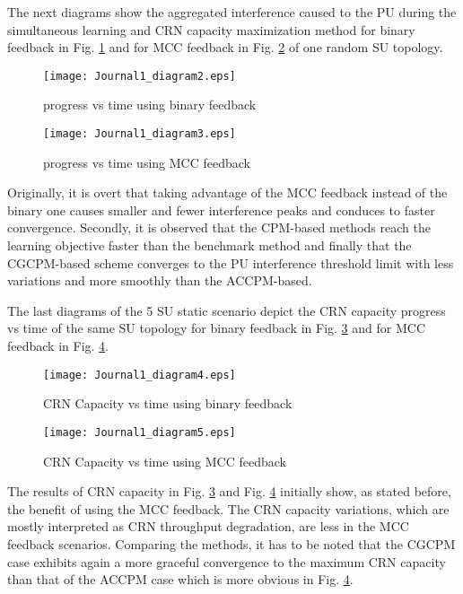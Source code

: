 \documentclass[journal]{IEEEtran}
\begin{document}
The next diagrams show the aggregated interference caused to the PU during the simultaneous learning and CRN capacity maximization method for binary feedback in Fig. \ref{fig4} and for MCC feedback in Fig. \ref{fig5} of one random SU topology.
\begin{figure}[!h]
\centering
\texttt{[image: Journal1\_diagram2.eps]}
\caption{ progress vs time using binary feedback}
\label{fig4}
\end{figure}
\begin{figure}[!h]
\centering
\texttt{[image: Journal1\_diagram3.eps]}
\caption{ progress vs time using MCC feedback}
\label{fig5}
\end{figure}
Originally, it is overt that taking advantage of the MCC feedback instead of the binary one causes smaller and fewer interference peaks and conduces to faster convergence. Secondly, it is observed that the CPM-based methods reach the learning objective faster than the benchmark method and finally that the CGCPM-based scheme converges to the PU interference threshold limit with less variations and more smoothly than the ACCPM-based.

The last diagrams of the 5 SU static scenario depict the CRN capacity progress vs time of the same SU topology for binary feedback in Fig. \ref{fig6} and for MCC feedback in Fig. \ref{fig7}.
\begin{figure}[!h]
\centering
\texttt{[image: Journal1\_diagram4.eps]}
\caption{CRN Capacity vs time using binary feedback}
\label{fig6}
\end{figure}
\begin{figure}[!h]
\centering
\texttt{[image: Journal1\_diagram5.eps]}
\caption{CRN Capacity vs time using MCC feedback}
\label{fig7}
\end{figure}
The results of CRN capacity in Fig. \ref{fig6} and Fig. \ref{fig7} initially show, as stated before, the benefit of using the MCC feedback. The CRN capacity variations, which are mostly interpreted as CRN throughput degradation, are less in the MCC feedback scenarios. Comparing the methods, it has to be noted that the CGCPM case exhibits again a more graceful convergence to the maximum CRN capacity than that of the ACCPM case which is more obvious in Fig. \ref{fig7}.
\end{document}

